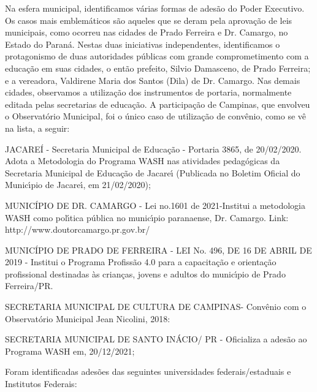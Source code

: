 \documentclass[
12pt,		%
openright,	%
twoside,  %
a4paper,			%
chapter=TITLE,		%
english,			%
french,				%
spanish,			%
brazil				%
]{USPSC-classe/USPSC}
\begin{document}
Na esfera municipal, identificamos  v\'arias formas de ades\~ao do Poder Executivo. Os casos mais emblem\'aticos s\~ao aqueles que se deram pela aprova\c{c}\~ao de leis municipais, como ocorreu nas cidades de Prado Ferreira e Dr. Camargo, no Estado do Paran\'a. Nestas duas iniciativas independentes, identificamos o protagonismo de duas autoridades p\'ublicas com grande comprometimento com a educa\c{c}\~ao em suas cidades, o ent\~ao prefeito, Silvio Damasceno, de Prado Ferreira; e a vereadora, Valdirene Maria dos Santos (Dila)  de Dr. Camargo. Nas demais cidades, observamos a utiliza\c{c}\~ao dos instrumentos de portaria, normalmente editada pelas secretarias de educa\c{c}\~ao. A participa\c{c}\~ao de Campinas, que envolveu o Observat\'orio Municipal, foi o \'unico caso de utiliza\c{c}\~ao de conv\^enio, como se v\^e na lista, a seguir:


















\begin{alineas}
\item JACARE\'I - Secretaria Municipal de Educa\c{c}\~ao - Portaria 3865, de 20/02/2020. Adota a Metodologia do Programa WASH nas atividades pedag\'ogicas da Secretaria Municipal de Educa\c{c}\~ao de Jacare\'{\i} (Publicada no Boletim Oficial do Munic\'{\i}pio de Jacare\'{\i}, em 21/02/2020);
\item MUNIC\'IPIO DE DR. CAMARGO - Lei no.1601 de 2021-Institui a metodologia WASH como pol\'{\i}tica p\'ublica no munic\'{\i}pio paranaense, Dr. Camargo. Link: http://www.doutorcamargo.pr.gov.br/
\item MUNIC\'IPIO DE PRADO DE FERREIRA - LEI No. 496, DE 16 DE ABRIL DE 2019 - Institui o Programa Profiss\~ao 4.0 para a capacita\c{c}\~ao e orienta\c{c}\~ao profissional destinadas \`as crian\c{c}as, jovens e adultos do munic\'{\i}pio de Prado Ferreira/PR.
\item SECRETARIA MUNICIPAL DE CULTURA DE CAMPINAS- Conv\^enio com o Observat\'orio Municipal Jean Nicolini, 2018:
\item SECRETARIA MUNICIPAL DE SANTO IN\'ACIO/ PR - Oficializa a ades\~ao ao Programa WASH em, 20/12/2021;
\end{alineas}

Foram identificadas ades\~oes das seguintes universidades federais/estaduais e Institutos Federais:
\end{document}
